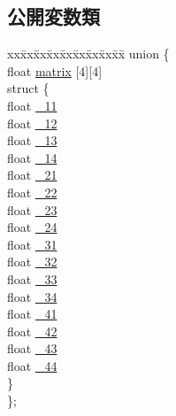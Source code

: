 \subsection*{公開変数類}
\begin{DoxyCompactItemize}
\item 
\begin{tabbing}
xx\=xx\=xx\=xx\=xx\=xx\=xx\=xx\=xx\=\kill
union \{\\
\>float \mbox{\hyperlink{struct_math_1_1_matrix4x4_a96b268eec9f5948dd5353e99a0d7c956}{matrix}} \mbox{[}4\mbox{]}\mbox{[}4\mbox{]}\\
\>struct \{\\
\>\>float \mbox{\hyperlink{struct_math_1_1_matrix4x4_a6286cd46feb2d7f065a6c536dee4405b}{\_11}}\\
\>\>float \mbox{\hyperlink{struct_math_1_1_matrix4x4_a11af6acd1dc9055fcf6a3f996d0edb3a}{\_12}}\\
\>\>float \mbox{\hyperlink{struct_math_1_1_matrix4x4_ac85f56b1032239a7f3c5617466c265df}{\_13}}\\
\>\>float \mbox{\hyperlink{struct_math_1_1_matrix4x4_a4ce2e1b4aaa1f97b423950e1237d2a57}{\_14}}\\
\>\>float \mbox{\hyperlink{struct_math_1_1_matrix4x4_a5e321aaa28a4b5e776b1e2002ab9ba3e}{\_21}}\\
\>\>float \mbox{\hyperlink{struct_math_1_1_matrix4x4_a3405e91df63a704e3d3a79570202b3af}{\_22}}\\
\>\>float \mbox{\hyperlink{struct_math_1_1_matrix4x4_a049d68f48f36069d70e613611570a644}{\_23}}\\
\>\>float \mbox{\hyperlink{struct_math_1_1_matrix4x4_addcdb0885353226c90ae80e371871850}{\_24}}\\
\>\>float \mbox{\hyperlink{struct_math_1_1_matrix4x4_a81f1469fb8e83f8255890ca0c59f8ff7}{\_31}}\\
\>\>float \mbox{\hyperlink{struct_math_1_1_matrix4x4_adfc5816a9b398be6b1ba9fc42a32c811}{\_32}}\\
\>\>float \mbox{\hyperlink{struct_math_1_1_matrix4x4_a1de5b49c33683c4c4049eacf26e10366}{\_33}}\\
\>\>float \mbox{\hyperlink{struct_math_1_1_matrix4x4_ab2445c944794987feee6f516b9313572}{\_34}}\\
\>\>float \mbox{\hyperlink{struct_math_1_1_matrix4x4_a81f4d26300dbfb8bde00a8bf6b21aa0d}{\_41}}\\
\>\>float \mbox{\hyperlink{struct_math_1_1_matrix4x4_af16525c898868cc68112beaf38604da5}{\_42}}\\
\>\>float \mbox{\hyperlink{struct_math_1_1_matrix4x4_a14106ef4b4723d705136a9b086848aed}{\_43}}\\
\>\>float \mbox{\hyperlink{struct_math_1_1_matrix4x4_ae9b31ecdda9e5f6677119809e010425e}{\_44}}\\
\>\} \\
\}; \\

\end{tabbing}\end{DoxyCompactItemize}


